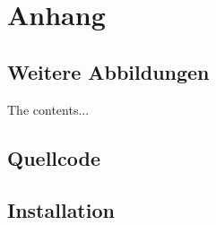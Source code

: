 
\chapter{Anhang}
\section{Weitere Abbildungen}

The contents...

\section{Quellcode}

\section{Installation}